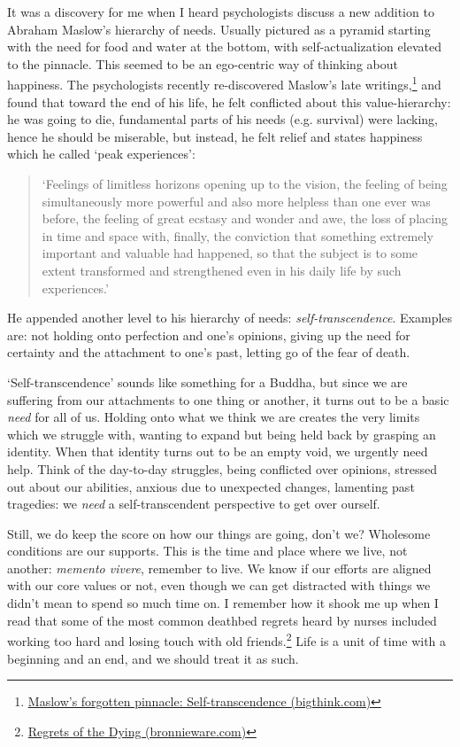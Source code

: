 It was a discovery for me when I heard psychologists discuss a new
addition to Abraham Maslow's hierarchy of needs. Usually pictured as a
pyramid starting with the need for food and water at the bottom, with
self-actualization elevated to the pinnacle. This seemed to be an
ego-centric way of thinking about happiness. The psychologists recently
re-discovered Maslow's late writings,\footnote{\href{https://bigthink.com/neuropsych/maslow-self-transcendence/}{Maslow's
  forgotten pinnacle: Self-transcendence (bigthink.com)}} and found that
toward the end of his life, he felt conflicted about this
value-hierarchy: he was going to die, fundamental parts of his needs
(e.g. survival) were lacking, hence he should be miserable, but instead,
he felt relief and states happiness which he called `peak experiences':

\begin{quote}
`Feelings of limitless horizons opening up to the vision, the feeling of
being simultaneously more powerful and also more helpless than one ever
was before, the feeling of great ecstasy and wonder and awe, the loss of
placing in time and space with, finally, the conviction that something
extremely important and valuable had happened, so that the subject is to
some extent transformed and strengthened even in his daily life by such
experiences.'
\end{quote}

He appended another level to his hierarchy of needs:
\emph{self-transcendence}. Examples are: not holding onto perfection and
one's opinions, giving up the need for certainty and the attachment to
one's past, letting go of the fear of death.

`Self-transcendence' sounds like something for a Buddha, but since we
are suffering from our attachments to one thing or another, it turns out
to be a basic \emph{need} for all of us. Holding onto what we think we
are creates the very limits which we struggle with, wanting to expand
but being held back by grasping an identity. When that identity turns
out to be an empty void, we urgently need help. Think of the day-to-day
struggles, being conflicted over opinions, stressed out about our
abilities, anxious due to unexpected changes, lamenting past tragedies:
we \emph{need} a self-transcendent perspective to get over ourself.

Still, we do keep the score on how our things are going, don't we?
Wholesome conditions are our supports. This is the time and place where
we live, not another: \emph{memento vivere}, remember to live. We know
if our efforts are aligned with our core values or not, even though we
can get distracted with things we didn't mean to spend so much time on.
I remember how it shook me up when I read that some of the most common
deathbed regrets heard by nurses included working too hard and losing
touch with old friends.\footnote{\href{https://bronnieware.com/blog/regrets-of-the-dying/}{Regrets
  of the Dying (bronnieware.com)}} Life is a unit of time with a
beginning and an end, and we should treat it as such.

